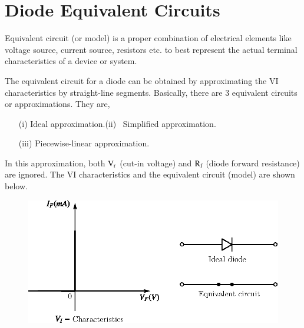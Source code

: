 \section{Diode Equivalent Circuits}\label{sec1.9}

 Equivalent circuit (or model) is a proper combination of electrical elements like voltage source, current source, resistors etc. to best represent the actual terminal characteristics of a device or system.

\vfill\eject

The equivalent circuit for a diode can be obtained by approximating the VI characteristics by straight-line segments. Basically, there are 3 equivalent circuits or approximations. They are,
\begin{itemize}
\item[(i)] Ideal approximation.\qquad (ii)~ Simplified approximation.

\item[(iii)] Piecewise-linear approximation.
\end{itemize}


In this approximation, both $\textrm{V}_{\textrm{r}}$ (cut-in voltage) and $\textrm{R}_{\textrm{f}}$ (diode forward resistance) are ignored. The VI characteristics and the equivalent circuit (model) are shown below.
\begin{figure}[H]
\centering
\includegraphics[scale=.91]{chap1/fig1.24.eps}
\caption{}\label{fig1.24}
\end{figure}

